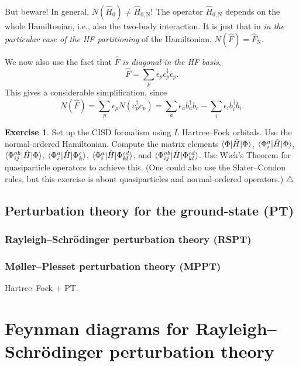 \documentclass{report}
\theoremstyle{plain}
\theoremstyle{definition}
\newtheorem{exerc}{Exercise}[chapter]
\newcommand\xqed[1]{%
  \leavevmode\unskip\penalty9999 \hbox{}\nobreak\hfill
  \quad\hbox{#1}}
\newcommand\demo{\xqed{$\triangle$}}
\newenvironment{exercise}{\bigskip\begin{exerc}}{\demo\end{exerc}\bigskip}
\begin{document}
But beware! In general, $N(\hat{H}_0) \neq \hat{H}_{0,\text{N}}$! The
operator $\hat{H}_{0,\text{N}}$ depends on the whole Hamiltonian,
i.e., also the two-body interaction. It is just that in \emph{in the
  particular case of the HF partitioning} of the Hamiltonian,
$N(\hat{F}) = \hat{F}_\text{N}$.

We now also use the fact that $\hat{F}$ \emph{is diagonal in the HF basis},
\begin{equation}
  \hat{F} = \sum_p \epsilon_p c^\dag_p c_p.
\end{equation}
This gives a considerable simplification, since
\begin{equation}
  N(\hat{F}) = \sum_p \epsilon_p N(c^\dag_p c_p) = \sum_a \epsilon_a
  b^\dag_a b_c - \sum_i \epsilon_i b^\dag_i b_i.
\end{equation}

\begin{exercise}
  Set up the CISD formalism using $L$ Hartree--Fock orbitals. Use the
  normal-ordered Hamiltonian. Compute the
  matrix elements $\braket{\Phi|\hat{H}|\Phi}$,
  $\braket{\Phi_i^a|\hat{H}|\Phi}$,
  $\braket{\Phi_{ij}^{ab}|\hat{H}|\Phi}$,
  $\braket{\Phi_i^a|\hat{H}|\Phi_k^c}$,
  $\braket{\Phi_{i}^{a}|\hat{H}|\Phi_{kl}^{cd}}$, and
  $\braket{\Phi_{ij}^{ab}|\hat{H}|\Phi_{kl}^{cd}}$. Use Wick's Theorem
  for quasiparticle operators to achieve this. (One could also use the
  Slater--Condon rules, but this exercise is about quasiparticles and
  normal-ordered operators.)
\end{exercise}  

\section{Perturbation theory for the ground-state (PT)} 
\label{sec:perturbation-theory}

\subsection{Rayleigh--Schr\"odinger perturbation theory (RSPT)}
\label{sec:rspt}

\subsection{M{\o}ller--Plesset perturbation theory (MPPT)}
\label{sec:mppt}

Hartree--Fock + PT.

\chapter{Feynman diagrams for Rayleigh--Schr\"odinger perturbation
  theory}
\label{sec:feynman}
\end{document}
